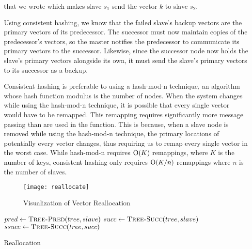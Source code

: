 that we wrote which makes slave \(s_1\) send the vector \(k\) to slave \(s_2\).
\par
Using consistent hashing, we know that the failed slave's backup vectors are
the primary vectors of its predecessor. The successor must now maintain copies
of the predecessor's vectors, so the master notifies the predecessor to
communicate its primary vectors to the successor. Likewise, since the successor
node now holds the slave's primary vectors alongside its own, it must send the
slave's primary vectors to its successor as a backup.
\par
Consistent hashing is preferable to using a hash-mod-n technique, an algorithm
whose hash function modulus is the number of nodes. When the system changes
while using the hash-mod-n technique, it is possible that every single vector
would have to be remapped. This remapping requires significantly more message
passing than are used in the  function. This is because,
when a slave node is removed while using the hash-mod-n technique, the primary
locations of potentially every vector changes, thus requiring us to remap every
single vector in the worst case. \cite{kleppmann2017} While hash-mod-n requires
\(\mathrm{O}(K)\) remappings, where \(K\) is the number of keys, consistent
hashing only requires \(\mathrm{O}(K/n)\) remappings where \(n\) is the number of
slaves. \cite{karger1997}
%
\begin{figure}
    \centering
    \texttt{[image: reallocate]}
    \caption{Visualization of Vector Reallocation}
    \label{fig:vector-reallocation}
\end{figure}
%
\begin{algorithm}
    \begin{algorithmic}
            \State $pred \gets \Call{Tree-Pred}{tree, slave}$
            \State $succ \gets \Call{Tree-Succ}{tree, slave}$
            \State $ssucc \gets \Call{Tree-Succ}{tree, succ}$
                \State {}
            \EndFor
                \State {}
            \EndFor
            \State {}
        \EndProcedure
    \end{algorithmic}
    \caption{Reallocation}
    \label{alg:reallocate}
\end{algorithm}
%
